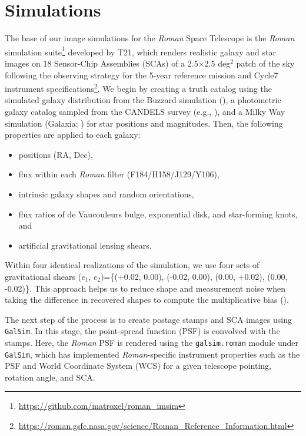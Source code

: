 \documentclass[fleqn,usenatbib]{mnras}
\begin{document}
\section{Simulations}
\label{sec:sims}
The base of our image simulations for the \emph{Roman} Space Telescope is the \emph{Roman} simulation suite\footnote{\url{ https://github.com/matroxel/roman_imsim}} developed by T21, which renders realistic galaxy and star images on 18 Sensor-Chip Assemblies (SCAs) of a 2.5$\times$2.5 deg$^{2}$ patch of the sky following the observing strategy for the 5-year reference mission and Cycle7 instrument specifications\footnote{\url{https://roman.gsfc.nasa.gov/science/Roman_Reference_Information.html}}. We begin by creating a truth catalog using the simulated galaxy distribution from the Buzzard simulation (\citealt{2019arXiv190102401D}), a photometric galaxy catalog sampled from the CANDELS survey (e.g., \citealt{2019ApJ...877..117H}), and a Milky Way simulation (Galaxia; \citealt{2011ApJ...730....3S}) for star positions and magnitudes. Then, the following properties are applied to each galaxy:
\begin{itemize}
    \item positions (RA, Dec),
    \item flux within each \emph{Roman} filter (F184/H158/J129/Y106),
    \item intrinsic galaxy shapes and random orientations,
    \item flux ratios of de Vaucouleurs bulge, exponential disk, and star-forming knots, and
    \item artificial gravitational lensing shears.
\end{itemize} 
Within four identical realizations of the simulation, we use four sets of gravitational shears ($e_{1}$, $e_{2}$)=\{(+0.02, 0.00), (-0.02, 0.00), (0.00, +0.02), (0.00, -0.02)\}. This approach helps us to reduce shape and measurement noise when taking the difference in recovered shapes to compute the multiplicative bias (\citealt{2019A&A...621A...2P}). 


The next step of the process is to create postage stamps and SCA images using \texttt{GalSim}. In this stage, the point-spread function (PSF) is convolved with the stamps. Here, the \emph{Roman} PSF is rendered using the \texttt{galsim.roman} module under \texttt{GalSim}, which has implemented \emph{Roman}-specific instrument properties such as the PSF and World Coordinate System (WCS) for a given telescope pointing, rotation angle, and SCA.
\end{document}
